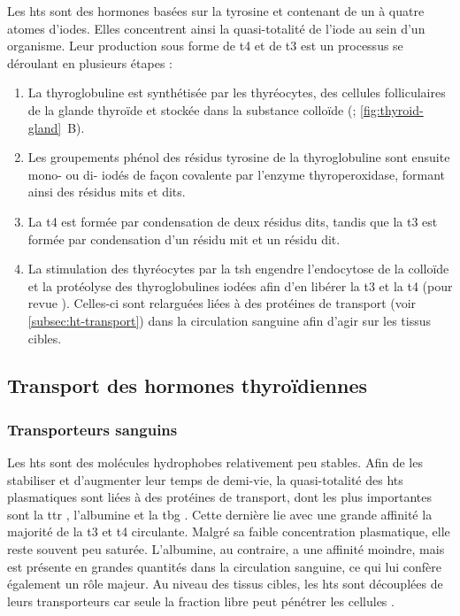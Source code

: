 \documentclass[../main.tex]{subfiles}
\begin{document}
		Les \glspl{ht} sont des hormones basées sur la tyrosine et contenant de un à quatre atomes d'iodes.
		Elles concentrent ainsi la quasi-totalité de l'iode au sein d'un organisme.
		Leur production sous forme de \gls{t4} et de \gls{t3} est un processus se déroulant en plusieurs étapes :
		\begin{enumerate}
			\item La thyroglobuline est synthétisée par les thyréocytes, des cellules folliculaires de la glande thyroïde et stockée dans la substance colloïde (\citealp{Lissitzky1981}; \autoref{fig:thyroid-gland}~B).
			\item Les groupements phénol des résidus tyrosine de la thyroglobuline sont ensuite mono- ou di- iodés de façon covalente par l'enzyme thyroperoxidase, formant ainsi des résidus \glspl{mit} et \glspl{dit}.
			\item La \gls{t4} est formée par condensation de deux résidus \glspl{dit}, tandis que la \gls{t3} est formée par condensation d'un résidu \gls{mit} et un résidu \gls{dit}.
			\item La stimulation des thyréocytes par la \gls{tsh} engendre l'endocytose de la colloïde et la protéolyse des thyroglobulines iodées afin d'en libérer la \gls{t3} et la \gls{t4} (pour revue \citealp{Rousset2003}).
			Celles-ci sont relarguées liées à des protéines de transport (voir \autoref{subsec:ht-transport}) dans la circulation sanguine afin d'agir sur les tissus cibles.
		\end{enumerate}


	\subsection{Transport des hormones thyroïdiennes}\label{subsec:ht-transport}

		\subsubsection{Transporteurs sanguins}
			Les \glspl{ht} sont des molécules hydrophobes relativement peu stables.
			Afin de les stabiliser et d'augmenter leur temps de demi-vie, la quasi-totalité des \glspl{ht} plasmatiques sont liées à des protéines de transport, dont les plus importantes sont la \gls{ttr} \citep{Palha2002}, l'albumine et la \gls{tbg} \citep{Schussler2000}.
			Cette dernière lie avec une grande affinité la majorité de la \gls{t3} et \gls{t4} circulante.
			Malgré sa faible concentration plasmatique, elle reste souvent peu saturée.
			L'albumine, au contraire, a une affinité moindre, mais est présente en grandes quantités dans la circulation sanguine, ce qui lui confère également un rôle majeur.
			Au niveau des tissus cibles, les \glspl{ht} sont découplées de leurs transporteurs car seule la fraction libre peut pénétrer les cellules \citep{Ekins1994}.
\end{document}
